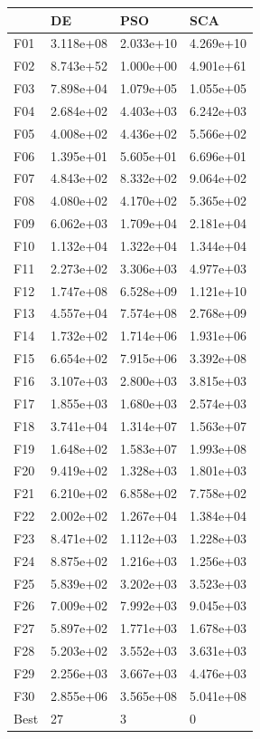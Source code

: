 \begin{tabular}{llll}
\toprule
{} &         DE &        PSO &        SCA \\
\midrule
F01  &  3.118e+08 &  2.033e+10 &  4.269e+10 \\
F02  &  8.743e+52 &  1.000e+00 &  4.901e+61 \\
F03  &  7.898e+04 &  1.079e+05 &  1.055e+05 \\
F04  &  2.684e+02 &  4.403e+03 &  6.242e+03 \\
F05  &  4.008e+02 &  4.436e+02 &  5.566e+02 \\
F06  &  1.395e+01 &  5.605e+01 &  6.696e+01 \\
F07  &  4.843e+02 &  8.332e+02 &  9.064e+02 \\
F08  &  4.080e+02 &  4.170e+02 &  5.365e+02 \\
F09  &  6.062e+03 &  1.709e+04 &  2.181e+04 \\
F10  &  1.132e+04 &  1.322e+04 &  1.344e+04 \\
F11  &  2.273e+02 &  3.306e+03 &  4.977e+03 \\
F12  &  1.747e+08 &  6.528e+09 &  1.121e+10 \\
F13  &  4.557e+04 &  7.574e+08 &  2.768e+09 \\
F14  &  1.732e+02 &  1.714e+06 &  1.931e+06 \\
F15  &  6.654e+02 &  7.915e+06 &  3.392e+08 \\
F16  &  3.107e+03 &  2.800e+03 &  3.815e+03 \\
F17  &  1.855e+03 &  1.680e+03 &  2.574e+03 \\
F18  &  3.741e+04 &  1.314e+07 &  1.563e+07 \\
F19  &  1.648e+02 &  1.583e+07 &  1.993e+08 \\
F20  &  9.419e+02 &  1.328e+03 &  1.801e+03 \\
F21  &  6.210e+02 &  6.858e+02 &  7.758e+02 \\
F22  &  2.002e+02 &  1.267e+04 &  1.384e+04 \\
F23  &  8.471e+02 &  1.112e+03 &  1.228e+03 \\
F24  &  8.875e+02 &  1.216e+03 &  1.256e+03 \\
F25  &  5.839e+02 &  3.202e+03 &  3.523e+03 \\
F26  &  7.009e+02 &  7.992e+03 &  9.045e+03 \\
F27  &  5.897e+02 &  1.771e+03 &  1.678e+03 \\
F28  &  5.203e+02 &  3.552e+03 &  3.631e+03 \\
F29  &  2.256e+03 &  3.667e+03 &  4.476e+03 \\
F30  &  2.855e+06 &  3.565e+08 &  5.041e+08 \\
Best &         27 &          3 &          0 \\
\bottomrule
\end{tabular}
